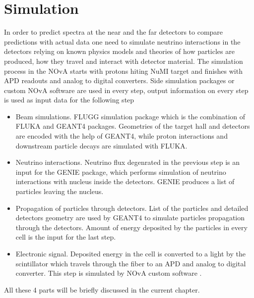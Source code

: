 \chapter{Simulation}
\label{simulation_chapter}

In order to predict spectra at the near and the far detectors to compare predictions with
actual data one need to simulate neutrino interactions in the detectors relying on
known physics models and theories of how particles are produced, how they travel and interact
with detector material. The simulation process in the NOvA starts with protons hiting
NuMI target and finishes with APD readouts and analog to digital converters. Side simulation
packages or custom NOvA software are used in every step, output information on every step is
used as input data for the following step
\begin{itemize}
\item Beam simulations. FLUGG simulation package which is the combination of FLUKA \cite{FLUKA} 
and GEANT4 \cite{GEANT4} packages. Geometries of the target hall and detectors are encoded with 
the help of GEANT4, while proton interactions and downstream particle decays are simulated with FLUKA.
\item Neutrino interactions. Neutrino flux degenrated in the previous step is an input for
the GENIE \cite{GENIE} package, which performs simulation of neutrino interactions with nucleus inside the
detectors. GENIE produces a list of particles leaving the nucleus.
\item Propagation of particles through detectors. List of the particles and detailed detectors geometry are
used by GEANT4 to simulate particles propagation through the detectors. Amount of energy deposited
by the particles in every cell is the input for the last step.
\item Electronic signal. Deposited energy in the cell is converted to a light by the scintillator
which travels through the fiber to an APD and analog to digital converter. This step is
simulated by NOvA custom software \cite{NovaSim}.
\end{itemize}
All these 4 parts will be briefly discussed in the current chapter.

